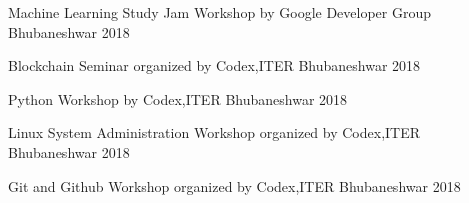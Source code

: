 

\begin{cvhonors}


  \cvhonor
    {Machine Learning Study Jam} %
    {Workshop by Google Developer Group} %
    {Bhubaneshwar} %
    {2018} %

  \cvhonor
    {Blockchain} %
    {Seminar organized by Codex,ITER} %
    {Bhubaneshwar} %
    {2018} %

  \cvhonor
    {Python} %
    {Workshop by Codex,ITER} %
    {Bhubaneshwar} %
    {2018} %

  \cvhonor
    {Linux System Administration} %
    {Workshop organized by Codex,ITER} %
    {Bhubaneshwar} %
    {2018} %

 \cvhonor
    {Git and Github} %
    {Workshop organized by Codex,ITER} %
    {Bhubaneshwar} %
    {2018} %
    
    

\end{cvhonors}
